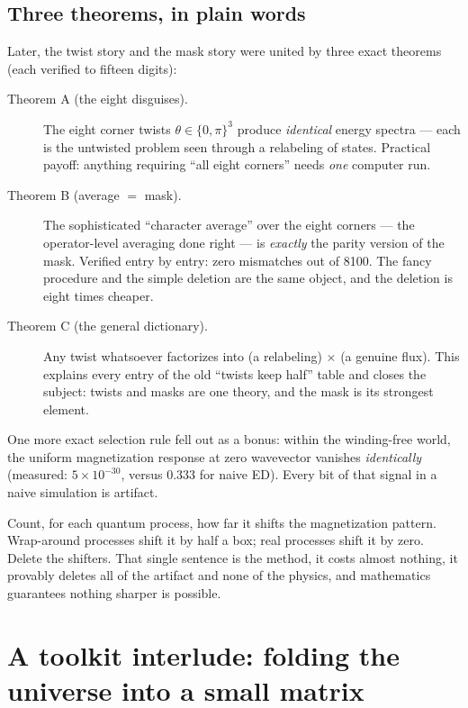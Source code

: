 \documentclass[11pt,a4paper]{article}
\begin{document}
\subsection{Three theorems, in plain words}
\label{sec:theorems}

Later, the twist story and the mask story were united by three exact theorems
(each verified to fifteen digits):

\begin{description}
\item[Theorem A (the eight disguises).]  The eight corner twists
$\theta\in\{0,\pi\}^3$ produce \emph{identical} energy spectra --- each is
the untwisted problem seen through a relabeling of states.  Practical payoff:
anything requiring ``all eight corners'' needs \emph{one} computer run.
\item[Theorem B (average $=$ mask).]  The sophisticated ``character
average'' over the eight corners --- the operator-level averaging done right
--- is \emph{exactly} the parity version of the mask.  Verified entry by
entry: zero mismatches out of 8100.  The fancy procedure and the simple
deletion are the same object, and the deletion is eight times cheaper.
\item[Theorem C (the general dictionary).]  Any twist whatsoever factorizes
into (a relabeling) $\times$ (a genuine flux).  This explains every entry of
the old ``twists keep half'' table and closes the subject: twists and masks
are one theory, and the mask is its strongest element.
\end{description}

One more exact selection rule fell out as a bonus: within the winding-free
world, the uniform magnetization response at zero wavevector vanishes
\emph{identically} (measured: $5\times10^{-30}$, versus $0.333$ for naive
ED).  Every bit of that signal in a naive simulation is artifact.

\begin{plainwords}
Count, for each quantum process, how far it shifts the magnetization pattern.
Wrap-around processes shift it by half a box; real processes shift it by
zero.  Delete the shifters.  That single sentence is the method, it costs
almost nothing, it provably deletes all of the artifact and none of the
physics, and mathematics guarantees nothing sharper is possible.
\end{plainwords}

\section{A toolkit interlude: folding the universe into a small matrix}
\label{sec:feshbach}
\end{document}
